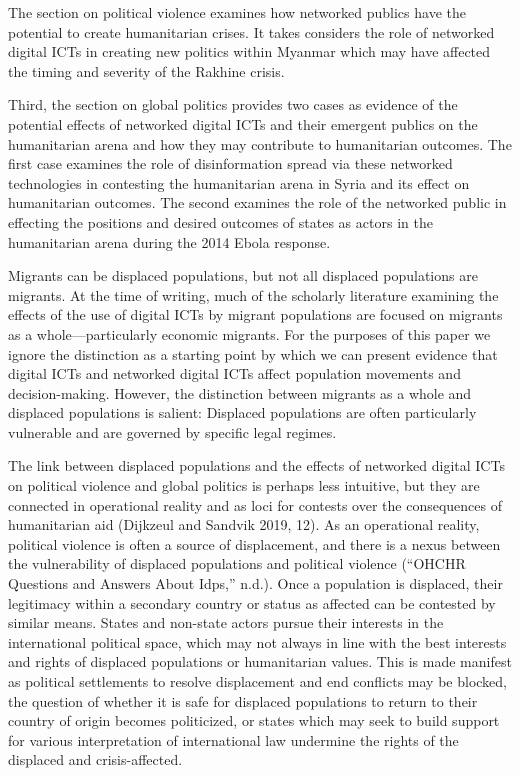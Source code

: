 \documentclass[
]{article}
\begin{document}
The section on political violence examines how networked publics have
the potential to create humanitarian crises. It takes considers the role
of networked digital ICTs in creating new politics within Myanmar which
may have affected the timing and severity of the Rakhine crisis.

Third, the section on global politics provides two cases as evidence of
the potential effects of networked digital ICTs and their emergent
publics on the humanitarian arena and how they may contribute to
humanitarian outcomes. The first case examines the role of
disinformation spread via these networked technologies in contesting the
humanitarian arena in Syria and its effect on humanitarian outcomes. The
second examines the role of the networked public in effecting the
positions and desired outcomes of states as actors in the humanitarian
arena during the 2014 Ebola response.

Migrants can be displaced populations, but not all displaced populations
are migrants. At the time of writing, much of the scholarly literature
examining the effects of the use of digital ICTs by migrant populations
are focused on migrants as a whole---particularly economic migrants. For
the purposes of this paper we ignore the distinction as a starting point
by which we can present evidence that digital ICTs and networked digital
ICTs affect population movements and decision-making. However, the
distinction between migrants as a whole and displaced populations is
salient: Displaced populations are often particularly vulnerable and are
governed by specific legal regimes.

The link between displaced populations and the effects of networked
digital ICTs on political violence and global politics is perhaps less
intuitive, but they are connected in operational reality and as loci for
contests over the consequences of humanitarian aid (Dijkzeul and Sandvik
2019, 12). As an operational reality, political violence is often a
source of displacement, and there is a nexus between the vulnerability
of displaced populations and political violence (``OHCHR Questions and
Answers About Idps,'' n.d.). Once a population is displaced, their
legitimacy within a secondary country or status as affected can be
contested by similar means. States and non-state actors pursue their
interests in the international political space, which may not always in
line with the best interests and rights of displaced populations or
humanitarian values. This is made manifest as political settlements to
resolve displacement and end conflicts may be blocked, the question of
whether it is safe for displaced populations to return to their country
of origin becomes politicized, or states which may seek to build support
for various interpretation of international law undermine the rights of
the displaced and crisis-affected.
\end{document}
